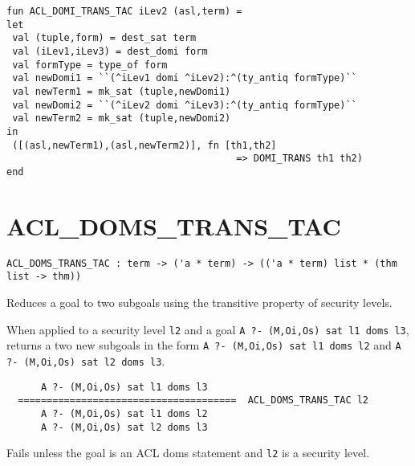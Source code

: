 \IMPLEMENTATION
\begin{holboxed}
\begin{verbatim}
fun ACL_DOMI_TRANS_TAC iLev2 (asl,term) =
let
 val (tuple,form) = dest_sat term
 val (iLev1,iLev3) = dest_domi form
 val formType = type_of form
 val newDomi1 = ``(^iLev1 domi ^iLev2):^(ty_antiq formType)``
 val newTerm1 = mk_sat (tuple,newDomi1)
 val newDomi2 = ``(^iLev2 domi ^iLev3):^(ty_antiq formType)``
 val newTerm2 = mk_sat (tuple,newDomi2)
in
 ([(asl,newTerm1),(asl,newTerm2)], fn [th1,th2] 
                                        => DOMI_TRANS th1 th2)
end
\end{verbatim}
\end{holboxed}

\SEEALSO
\ENDDOC

\section{ACL\_DOMS\_TRANS\_TAC}



\small{
\begin{lstlisting}[breaklines]
ACL_DOMS_TRANS_TAC : term -> ('a * term) -> (('a * term) list * (thm list -> thm))
\end{lstlisting}}\egroup

\SYNOPSIS
Reduces a goal to two subgoals using the transitive property of security levels.

\DESCRIBE When applied to a security level \texttt{l2} and a goal \texttt{A ?- (M,Oi,Os) sat l1 doms l3}, returns a two new subgoals in the form \texttt{A ?- (M,Oi,Os) sat l1 doms l2} and \texttt{A ?- (M,Oi,Os) sat l2 doms l3}.
\begin{verbatim}
      A ?- (M,Oi,Os) sat l1 doms l3
  ======================================  ACL_DOMS_TRANS_TAC l2
      A ?- (M,Oi,Os) sat l1 doms l2     
      A ?- (M,Oi,Os) sat l2 doms l3
\end{verbatim}

\FAILURE 
Fails unless the goal is an ACL doms statement and \texttt{l2} is a security level.

